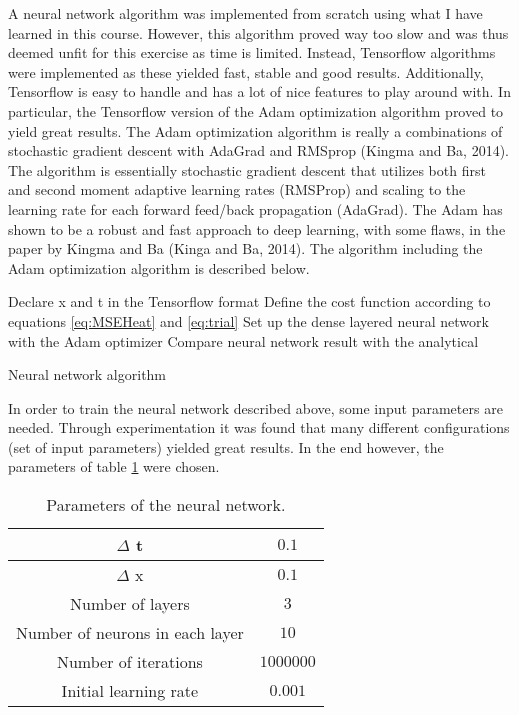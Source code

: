\documentclass[12pt,a4paper]{article}
\begin{document}
\noindent A neural network algorithm was implemented from scratch using what I have learned in this course. However, this algorithm proved way too slow and was thus deemed unfit for this exercise as time is limited. Instead, Tensorflow algorithms were implemented as these yielded fast, stable and good results. Additionally, Tensorflow is easy to handle and has a lot of nice features to play around with. In particular, the Tensorflow version of the Adam optimization algorithm proved to yield great results. The Adam optimization algorithm is really a combinations of stochastic gradient descent with AdaGrad and RMSprop (Kingma and Ba, 2014). The algorithm is essentially stochastic gradient descent that utilizes both first and second moment adaptive learning rates (RMSProp) and scaling to the learning rate for each forward feed/back propagation (AdaGrad). The Adam has shown to be a robust and fast approach to deep learning, with some flaws, in the paper by Kingma and Ba (Kinga and Ba, 2014). The algorithm including the Adam optimization algorithm is described below.

\begin{algorithm}[H]
\SetAlgoLined
{}
 Declare x and t in the Tensorflow format\;
 Define the cost function according to equations \ref{eq:MSEHeat} and \ref{eq:trial}\;
 Set up the dense layered neural network with the Adam optimizer\;
  Compare neural network result with the analytical
 \caption{Neural network algorithm}
\end{algorithm}

\noindent In order to train the neural network described above, some input parameters are needed. Through experimentation it was found that many different configurations (set of input parameters) yielded great results. In the end however, the parameters of table \ref{tab:NNparams} were chosen.

\begin{table}[h]
\caption{\label{tab:NNparams} Parameters of the neural network.}
\centering
\begin{tabular}{|c|c|}
\hline
$\Delta$ t & $0.1$\\
\hline
$\Delta$ x & $0.1$\\
\hline
Number of layers & $3$\\
\hline
Number of neurons in each layer & $10$\\
\hline
Number of iterations & $1000000$\\
\hline
Initial learning rate & $0.001$\\
\hline
\end{tabular}
\end{table}
\end{document}
